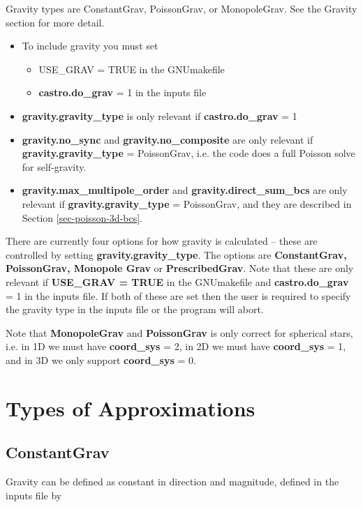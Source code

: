 Gravity types are ConstantGrav, PoissonGrav, or MonopoleGrav.  See the Gravity section for more detail.

\begin{itemize}
\item To include gravity you must set 
\begin{itemize}
\item USE\_GRAV  = TRUE in the GNUmakefile 
\item {\bf castro.do\_grav} = 1 in the inputs file
\end{itemize}
\item {\bf gravity.gravity\_type} is  only relevant if {\bf castro.do\_grav} = 1 
\item {\bf gravity.no\_sync} and {\bf gravity.no\_composite} are only relevant if {\bf gravity.gravity\_type} = PoissonGrav,
i.e. the code does a full Poisson solve for self-gravity.
\item {\bf gravity.max\_multipole\_order} and {\bf gravity.direct\_sum\_bcs} are only relevant if {\bf gravity.gravity\_type} = PoissonGrav,
and they are described in Section \ref{sec-poisson-3d-bcs}.
\end{itemize}


There are currently four options for how gravity is calculated -- 
these are controlled by setting {\bf gravity.gravity\_type}.  
The options are {\bf ConstantGrav, PoissonGrav, Monopole Grav} or {\bf PrescribedGrav}.
Note that these are only relevant if {\bf USE\_GRAV = TRUE} in the GNUmakefile
and {\bf castro.do\_grav} = 1 in the inputs file.  If both of these are
set then the user is required to specify the gravity type in the inputs file
or the program will abort. 

Note that {\bf MonopoleGrav} and {\bf PoissonGrav} is only correct for 
spherical stars, i.e. in 1D we must have {\bf coord\_sys} = 2, 
in 2D we must have {\bf coord\_sys} = 1, and in 3D we only support {\bf coord\_sys} = 0.

\section{Types of Approximations}

\subsection{ConstantGrav}

Gravity can be defined as constant in direction and magnitude, 
defined in the inputs file by 


